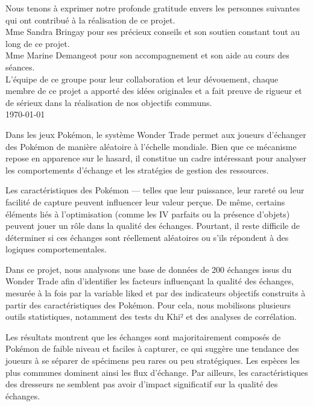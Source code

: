 \documentclass[mstat,12pt]{unswthesis}
\begin{document}



{\bigskip}Nous tenons à exprimer notre profonde gratitude envers les
personnes suivantes qui ont contribué à la réalisation de ce
projet.\\[1cm] Mme Sandra Bringay pour ses précieux conseils et son
soutien constant tout au long de ce projet.\\[1cm] Mme Marine Demangeot
pour son accompagnement et son aide au cours des
séances.\\[1cm] L'équipe de ce groupe pour leur collaboration et leur
dévouement, chaque membre de ce projet a apporté des idées originales et
a fait preuve de rigueur et de sérieux dans la réalisation de nos
objectifs communs.\\[1cm] 

{\bigskip\bigskip\bigskip\noindent} \today





Dans les jeux Pokémon, le système Wonder Trade permet aux joueurs d'échanger des Pokémon de manière aléatoire à l'échelle mondiale. Bien que ce mécanisme repose en apparence sur le hasard, il constitue un cadre intéressant pour analyser les comportements d'échange et les stratégies de gestion des ressources.

{\medskip}

Les caractéristiques des Pokémon — telles que leur puissance, leur rareté ou leur facilité de capture peuvent influencer leur valeur perçue. De même, certains éléments liés à l'optimisation (comme les IV parfaits ou la présence d'objets) peuvent jouer un rôle dans la qualité des échanges. Pourtant, il reste difficile de déterminer si ces échanges sont réellement aléatoires ou s'ils répondent à des logiques comportementales.

{\medskip}

Dans ce projet, nous analysons une base de données de 200 échanges issus du Wonder Trade afin d'identifier les facteurs influençant la qualité des échanges, mesurée à la fois par la variable liked et par des indicateurs objectifs construits à partir des caractéristiques des Pokémon. Pour cela, nous mobilisons plusieurs outils statistiques, notamment des tests du Khi² et des analyses de corrélation.

{\medskip}

Les résultats montrent que les échanges sont majoritairement composés de Pokémon de faible niveau et faciles à capturer, ce qui suggère une tendance des joueurs à se séparer de spécimens peu rares ou peu stratégiques. Les espèces les plus communes dominent ainsi les flux d'échange. Par ailleurs, les caractéristiques des dresseurs ne semblent pas avoir d'impact significatif sur la qualité des échanges.
\end{document}
